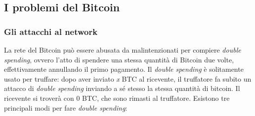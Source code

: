 \documentclass {article}
\begin{document}
\subsection {I problemi del Bitcoin}


\subsubsection {Gli attacchi al network}

La rete del Bitcoin può essere abusata da malintenzionati per compiere \textit{double spending}, ovvero l'atto di spendere una stessa quantità di Bitcoin due volte, effettivamente annullando il primo pagamento.
Il \textit{double spending} è solitamente usato per truffare: dopo aver inviato \textit{x} BTC al ricevente, il truffatore fa subito un attacco di \textit{double spending} inviando a sé stesso la stessa quantità di bitcoin. Il ricevente si troverà con 0 BTC, che sono rimasti al truffatore.
Esistono tre principali modi per fare \textit{double spending}:
\end{document}
